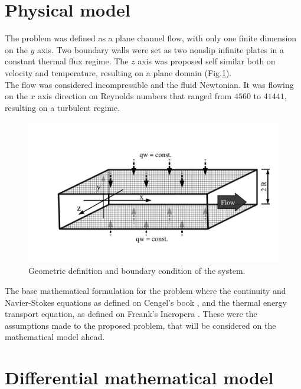 \documentclass[10pt]{article} %
\begin{document}
\section{Physical model}

The problem was defined as a plane channel flow, with only one finite dimension on the $y$ axis. Two boundary walls were set as two nonslip infinite plates in a constant thermal flux regime. The $z$ axis was proposed self similar both on velocity and temperature, resulting on a plane domain (Fig.\ref{figure.1}). \\
The flow was considered incompressible and the fluid Newtonian. It was flowing on the $x$ axis direction on Reynolds numbers that ranged from $4560$ to $41441$, resulting on a turbulent regime. 

\begin{figure}[h!]
	\centering
	\includegraphics[angle=0, scale=0.50]{fotos_formatacao_final/canal1}
	\caption{Geometric definition and boundary condition of the system.}
	\label{figure.1}
\end{figure}

The base mathematical formulation for the problem where the continuity and Navier-Stokes equations as defined on Cengel's book \cite{Cengel}, and the thermal energy transport equation, as defined on Freank's Incropera \cite{Incropera}. These were the assumptions made to the proposed problem, that will be considered on the mathematical model ahead.









\section{Differential mathematical model}
\end{document}

